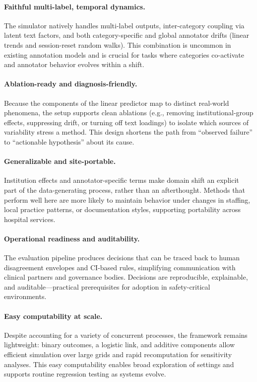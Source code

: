 \documentclass[12pt]{article}
\begin{document}
\paragraph{Faithful multi-label, temporal dynamics.}
The simulator natively handles multi-label outputs, inter-category coupling via latent text factors, and both category-specific and global annotator drifts (linear trends and session-reset random walks). This combination is uncommon in existing annotation models and is crucial for tasks where categories co-activate and annotator behavior evolves within a shift.

\paragraph{Ablation-ready and diagnosis-friendly.}
Because the components of the linear predictor map to distinct real-world phenomena, the setup supports clean ablations (e.g., removing institutional-group effects, suppressing drift, or turning off text loadings) to isolate which sources of variability stress a method. This design shortens the path from ``observed failure'' to ``actionable hypothesis'' about its cause.

\paragraph{Generalizable and site-portable.}
Institution effects and annotator-specific terms make domain shift an explicit part of the data-generating process, rather than an afterthought. Methods that perform well here are more likely to maintain behavior under changes in staffing, local practice patterns, or documentation styles, supporting portability across hospital services.

\paragraph{Operational readiness and auditability.}
The evaluation pipeline produces decisions that can be traced back to human disagreement envelopes and CI-based rules, simplifying communication with clinical partners and governance bodies. Decisions are reproducible, explainable, and auditable—practical prerequisites for adoption in safety-critical environments.

\paragraph{Easy computability at scale.}
Despite accounting for a variety of concurrent processes, the framework remains lightweight: binary outcomes, a logistic link, and additive components allow efficient simulation over large grids and rapid recomputation for sensitivity analyses. This easy computability enables broad exploration of settings and supports routine regression testing as systems evolve.
\end{document}
